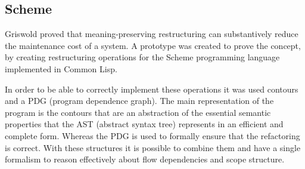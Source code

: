 
\subsection{Scheme}

Griswold \cite{griswold1991program} proved that meaning-preserving restructuring can substantively reduce the maintenance cost of a system.
A prototype was created to prove the concept, by creating restructuring operations for the Scheme programming language implemented in Common Lisp.





In order to be able to correctly implement these operations it was used contours and a PDG (program dependence graph). 
The main representation of the program is the contours that are an abstraction of the essential semantic properties that the AST (abstract syntax tree) represents in an efficient and complete form.
Whereas the PDG is used to formally ensure that the refactoring is correct.
With these structures it is possible to combine them and have a single formalism to reason effectively about flow dependencies and scope structure.

